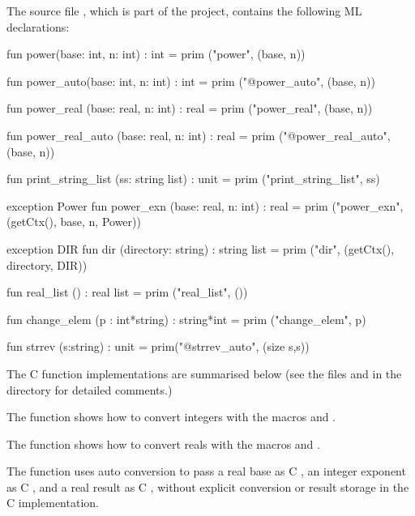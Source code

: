 \documentclass[12pt]{book}
\begin{document}
The source file , which is part of the  project,
contains the following ML declarations:
\begin{smlcode}
  fun power(base: int, n: int) : int =
    prim ("power", (base, n))

  fun power_auto(base: int, n: int) : int =
    prim ("@power_auto", (base, n))

  fun power_real (base: real, n: int) : real =
    prim ("power_real", (base, n))

  fun power_real_auto (base: real, n: int) : real =
    prim ("@power_real_auto", (base, n))

  fun print_string_list (ss: string list) : unit =
    prim ("print_string_list", ss)

  exception Power
  fun power_exn (base: real, n: int) : real =
    prim ("power_exn", (getCtx(), base, n, Power))

  exception DIR
  fun dir (directory: string) : string list =
    prim ("dir", (getCtx(), directory, DIR))

  fun real_list () : real list =
    prim ("real_list", ())

  fun change_elem (p : int*string) : string*int =
    prim ("change_elem", p)

  fun strrev (s:string) : unit =
    prim("@strrev_auto", (size s,s))
\end{smlcode}

The C function implementations are summarised below (see the files
 and  in the  directory for detailed
comments.)

\begin{example}\label{power.ex}
  The  function shows how to convert
  integers with the macros  and .
\end{example}

\begin{example}\label{power_real.ex}
  The  function shows how
  to convert reals with the macros  and .
\end{example}

\begin{example}\label{power_real_auto.ex}
  The  function uses auto conversion to pass a real
  base as C , an integer exponent as C , and a real
  result as C , without explicit conversion or result storage
  in the C implementation.
\end{example}
\end{document}
